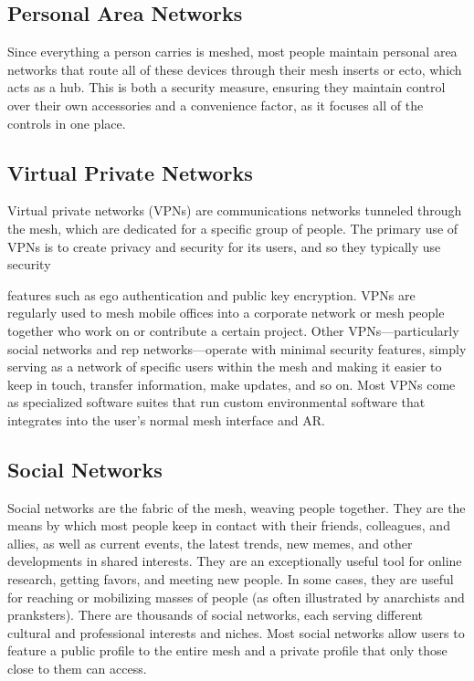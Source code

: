\subsection{Personal Area Networks} 

Since everything a person carries is meshed, most people maintain personal area networks that route all of these devices through their mesh inserts or ecto, which acts as a hub. This is both a security measure, ensuring they maintain control over their own accessories and a convenience factor, as it focuses all of the controls in one place. 

\subsection{Virtual Private Networks} 

Virtual private networks (VPNs) are communications networks tunneled through the mesh, which are dedicated for a specific group of people. The primary use of VPNs is to create privacy and security for its users, and so they typically use security 

features such as ego authentication and public key encryption. VPNs are regularly used to mesh mobile offices into a corporate network or mesh people together who work on or contribute a certain project. Other VPNs—particularly social networks and rep networks—operate with minimal security features, simply serving as a network of specific users within the mesh and making it easier to keep in touch, transfer information, make updates, and so on. Most VPNs come as specialized software suites that run custom environmental software that integrates into the user's normal mesh interface and AR. 

\subsection{Social Networks} 

Social networks are the fabric of the mesh, weaving people together. They are the means by which most people keep in contact with their friends, colleagues, and allies, as well as current events, the latest trends, new memes, and other developments in shared interests. They are an exceptionally useful tool for online research, getting favors, and meeting new people. In some cases, they are useful for reaching or mobilizing masses of people (as often illustrated by anarchists and pranksters). There are thousands of social networks, each serving different cultural and professional interests and niches. Most social networks allow users to feature a public profile to the entire mesh and a private profile that only those close to them can access. 

